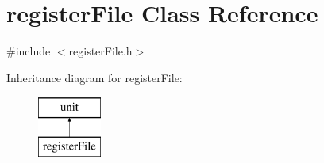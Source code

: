 \hypertarget{classregisterFile}{
\section{registerFile Class Reference}
\label{classregisterFile}
}


{\ttfamily \#include $<$registerFile.h$>$}

Inheritance diagram for registerFile:\begin{figure}[H]
\begin{center}
\leavevmode
\includegraphics[height=2.000000cm]{classregisterFile}
\end{center}
\end{figure}
